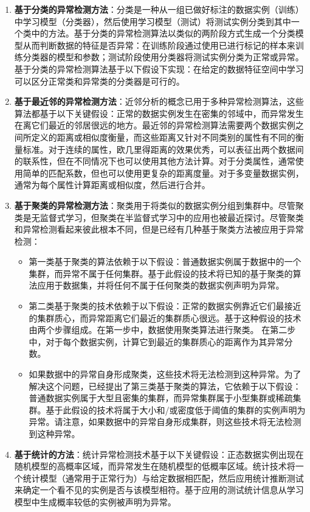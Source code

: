 \documentclass[a4paper,AutoFakeBold,oneside,12pt]{book}
\begin{document}
\begin{enumerate}
\item \textbf{基于分类的异常检测方法}：分类是一种从一组已做好标注的数据实例（训练）中学习模型（分类器），然后使用学习模型（测试）将测试实例分类到其中一个类中的方法。基于分类的异常检测算法以类似的两阶段方式生成一个分类模型从而判断数据的特征是否异常：在训练阶段通过使用已进行标记的样本来训练分类器的模型和参数；测试阶段使用分类器将测试实例分类为正常或异常。基于分类的异常检测算法基于以下假设下实现：在给定的数据特征空间中学习可以区分正常类和异常类的分类器是可行的。

\item \textbf{基于最近邻的异常检测方法}：近邻分析的概念已用于多种异常检测算法，这些算法都基于以下关键假设：正常的数据实例发生在密集的邻域中，而异常发生在离它们最近的邻居很远的地方。最近邻的异常检测算法需要两个数据实例之间所定义的距离或相似度衡量，而这些距离又针对不同类别的属性有不同的衡量标准。对于连续的属性，欧几里得距离的效果优秀，可以表征出两个数据间的联系性，但在不同情况下也可以使用其他方法计算。对于分类属性，通常使用简单的匹配系数，但也可以使用更复杂的距离度量。对于多变量数据实例，通常为每个属性计算距离或相似度，然后进行合并。

\item \textbf{基于聚类的异常检测方法}：聚类用于将类似的数据实例分组到集群中。尽管聚类是无监督式学习，但聚类在半监督式学习中的应用也被最近探讨。尽管聚类和异常检测看起来彼此根本不同，但是已经有几种基于聚类方法被应用于异常检测：
\begin{itemize}
\item 第一类基于聚类的算法依赖于以下假设：普通数据实例属于数据中的一个集群，而异常不属于任何集群。基于此假设的技术将已知的基于聚类的算法应用于数据集，并将任何不属于任何聚类的数据实例声明为异常。 
\item 第二类基于聚类的技术依赖于以下假设：正常的数据实例靠近它们最接近的集群质心，而异常距离它们最近的集群质心很远。基于这种假设的技术由两个步骤组成。在第一步中，数据使用聚类算法进行聚类。 在第二步中，对于每个数据实例，计算它到最近的集群质心的距离作为其异常分数。
\item 如果数据中的异常自身形成聚类，这些技术将无法检测到这种异常。为了解决这个问题，已经提出了第三类基于聚类的算法，它依赖于以下假设：普通数据实例属于大型且密集的集群，而异常集群属于小型集群或稀疏集群。基于此假设的技术将属于大小和/或密度低于阈值的集群的实例声明为异常。请注意，如果数据中的异常自身形成集群，则这些技术将无法检测到这种异常。
\end{itemize}

\item \textbf{基于统计的方法}：统计异常检测技术基于以下关键假设：正态数据实例出现在随机模型的高概率区域，而异常发生在随机模型的低概率区域。统计技术将一个统计模型（通常用于正常行为）与给定数据相匹配，然后应用统计推断测试来确定一个看不见的实例是否与该模型相符。基于应用的测试统计信息从学习模型中生成概率较低的实例被声明为异常。
\end{enumerate}
\end{document}
